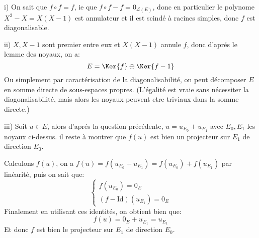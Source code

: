 \documentclass{report}
\begin{document}
      i) On sait que \(f \circ f = f\), ie que \(f \circ f - f = 0_{\mathcal{L}(E)}\), donc en particulier le polynome \(X^2 - X = X(X - 1)\) est annulateur et il est scindé à racines simples, donc \(f\) est diagonalisable.\<

      ii) \(X, X-1\) sont premier entre eux et \(X(X-1)\) annule \(f\), donc d'aprés le lemme des noyaux, on a:
      \[
         E = \Ker{f} \oplus \Ker{f - 1}
      \]
      Ou simplement par caractérisation de la diagonalisabilité, on peut décomposer \(E\) en somme directe de sous-espaces propres. (L'égalité est vraie sans nécessiter la diagonalisabilité, mais alors les noyaux peuvent etre triviaux dans la somme directe.)\<

      iii) Soit \(u \in E\), alors d'aprés la question précédente, \(u = u_{E_0} + u_{E_1}\) avec \(E_0, E_1\) les noyaux ci-dessus. il reste à montrer que \(f(u)\) est bien un projecteur sur \(E_1\) de direction \(E_0\).\<

      Calculons \(f(u)\), on a \(f(u) = f(u_{E_0} + u_{E_1}) = f(u_{E_0}) + f(u_{E_1})\) par linéarité, puis on sait que:
      \[
         \begin{cases}
            f(u_{E_0}) = 0_E\\
            (f - \text{Id})(u_{E_1}) = 0_E
         \end{cases}  
      \]
      Finalement en utilisant ces identités, on obtient bien que:
      \[
         f(u) = 0_E + u_{E_1} = u_{E_1}
      \]
      Et donc \(f\) est bien le projecteur sur \(E_1\) de direction \(E_0\).
\end{document}
